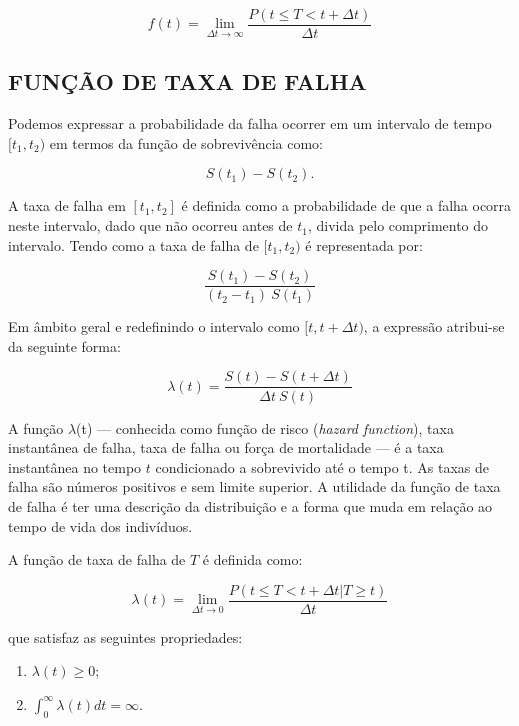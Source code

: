 \begin{equation}\label{eq:lim-survival}
	f(t) = \displaystyle{\lim_{\Delta t \to \infty}} \frac{P(t \leq T < t + \Delta t)}{\Delta t}
\end{equation}

		  \subsection{FUNÇÃO DE TAXA DE FALHA}

Podemos expressar a probabilidade da falha ocorrer em um intervalo de tempo $[t_1,t_2)$ em termos da função de sobrevivência como:

$$
S(t_1) - S(t_2).
$$

A taxa de falha em $[t_1,t_2]$ é definida como a probabilidade de que a falha ocorra neste intervalo, dado que não ocorreu antes de $t_1$, divida pelo comprimento do intervalo. Tendo como a taxa de falha de $[t_1,t_2)$ é representada por:

\begin{equation}\label{eq:taxa-de-falha}
	\frac{S(t_1) - S(t_2)}{(t_2 - t_1) \ S(t_1)}
\end{equation}

Em âmbito geral e redefinindo o intervalo como $[t, t + \Delta t)$, a expressão atribui-se da seguinte forma:

\begin{equation}\label{taxa-de-falha1}
	\lambda(t) = \frac{S(t) - S(t + \Delta t)}{\Delta t \ S(t)}
\end{equation}

A função $\lambda$(t) --- conhecida como função de risco (\textit{hazard function}), taxa instantânea de falha, taxa de falha ou força de mortalidade ---  é a taxa instantânea no tempo $t$ condicionado a sobrevivido até o tempo t. As taxas de falha são números positivos e sem limite superior. A utilidade da função de taxa de falha é ter uma descrição da distribuição e a forma que muda em relação ao tempo de vida dos indivíduos. 

A função de taxa de falha de $T$ é definida como:

\begin{equation}\label{hazard-function}
	\lambda(t) = \displaystyle{\lim_{\Delta t \to 0}} \frac{P(t \leq T < t + \Delta t | T \geq t)}{\Delta t }
\end{equation}

\noindent que satisfaz as seguintes propriedades: 

\begin{enumerate}
	\item $\lambda(t) \geq 0$;
	\item $\int_{0}^{\infty} \lambda(t) dt = \infty$.
\end{enumerate}



